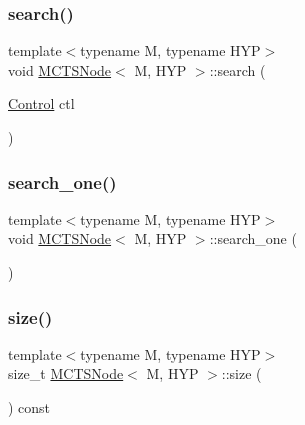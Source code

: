 \mbox{\label{class_m_c_t_s_node_a0cf85ac07dd2a3f21fea0737834b8cf1}} 
\subsubsection{\texorpdfstring{search()}{search()}}
{\footnotesize\ttfamily template$<$typename M, typename H\+YP$>$ \\
void \hyperlink{class_m_c_t_s_node}{M\+C\+T\+S\+Node}$<$ M, H\+YP $>$\+::search (\begin{DoxyParamCaption}\item[{\hyperlink{struct_control}{Control}}]{ctl }\end{DoxyParamCaption})\hspace{0.3cm}{\ttfamily [inline]}}

\mbox{\label{class_m_c_t_s_node_ad0766d2829bb1cb252dd6aac51ac0d95}} 
\subsubsection{\texorpdfstring{search\+\_\+one()}{search\_one()}}
{\footnotesize\ttfamily template$<$typename M, typename H\+YP$>$ \\
void \hyperlink{class_m_c_t_s_node}{M\+C\+T\+S\+Node}$<$ M, H\+YP $>$\+::search\+\_\+one (\begin{DoxyParamCaption}{ }\end{DoxyParamCaption})\hspace{0.3cm}{\ttfamily [inline]}}

\mbox{\label{class_m_c_t_s_node_a7996e64e69b1fc705c4e21b4a6e41c39}} 
\subsubsection{\texorpdfstring{size()}{size()}}
{\footnotesize\ttfamily template$<$typename M, typename H\+YP$>$ \\
size\+\_\+t \hyperlink{class_m_c_t_s_node}{M\+C\+T\+S\+Node}$<$ M, H\+YP $>$\+::size (\begin{DoxyParamCaption}{ }\end{DoxyParamCaption}) const\hspace{0.3cm}{\ttfamily [inline]}}



